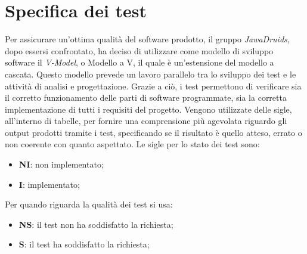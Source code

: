 \chapter{Specifica dei test} \label{SpecificaDeiTest}

Per assicurare un’ottima qualità del software prodotto, il gruppo \textit{JawaDruids}, dopo essersi confrontato, ha deciso di utilizzare come modello di sviluppo software il \textit{V-Model}, o Modello a V, il quale è un’estensione del modello a cascata.
Questo modello prevede un lavoro parallelo tra lo sviluppo dei test e le attività di analisi e progettazione.
Grazie a ciò, i test permettono di verificare sia il corretto funzionamento delle parti di software programmate, sia la corretta implementazione di tutti i requisiti del progetto.
Vengono utilizzate delle sigle, all’interno di tabelle, per fornire una comprensione più agevolata riguardo gli output prodotti tramite i test, specificando se il risultato è quello atteso, errato o non coerente con quanto aspettato.
Le sigle per lo stato dei test sono:
\begin{itemize}
	\item \textbf{NI}: non implementato;
	\item \textbf{I}: implementato;
\end{itemize}
Per quando riguarda la qualità dei test si usa:
\begin{itemize}
	\item \textbf{NS}: il test non ha soddisfatto la richiesta;
	\item \textbf{S}: il test ha soddisfatto la richiesta; 
\end{itemize}


